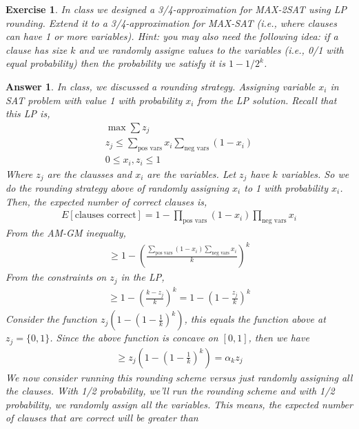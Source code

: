 \documentclass[12pt]{article}
\theoremstyle{colon}
\newtheorem{exercise}{Exercise}
\newtheorem*{answer}{Answer}
\begin{document}
\clearpage

\begin{exercise}
  In class we designed a 3/4-approximation for MAX-2SAT using LP rounding. Extend it to a 3/4-approximation for MAX-SAT (i.e., where clauses can have 1 or more variables). Hint: you may also need the following idea: if a clause has size $k$ and we randomly assigne values to the variables (i.e., 0/1 with equal probability) then the probability we satisfy it is $1-1/2^k$.
\end{exercise}

\begin{answer}
  In class, we discussed a rounding strategy. Assigning variable $x_i$ in SAT problem with value 1 with probability $x_i$ from the LP solution. Recall that this LP is,
  \begin{gather*}
    \max \sum z_j \\
    z_j \leq \sum_{\text{pos vars}} x_i \sum_{\text{neg vars}} (1-x_i) \\
    0 \leq x_i, z_i \leq 1
  \end{gather*}
  Where $z_j$ are the clausses and $x_i$ are the variables. Let $z_j$ have $k$ variables. So we do the rounding strategy above of randomly assigning $x_i$ to 1 with probability $x_i$. Then, the expected number of correct clauses is,
  \begin{gather*}
    E[\text{clauses correct}] = 1 - \prod_{\text{pos vars}} (1-x_i) \prod_{\text{neg vars}} x_i
  \end{gather*}
  From the AM-GM inequalty,
  \begin{gather*}
    \geq 1 - \left( \frac{\sum_{\text{pos vars}} (1-x_i) \sum_{\text{neg vars}} x_i}{k} \right)^k
  \end{gather*}
  From the constraints on $z_j$ in the LP,
  \begin{gather*}
    \geq 1 - \left( \frac{k - z_j}{k} \right)^k = 1 - \left( 1 - \frac{z_j}{k} \right)^k
  \end{gather*}
  Consider the function $z_j \left(1 - \left( 1 - \frac{1}{k} \right)^k \right)$, this equals the function above at $z_j = \{0,1\}$. Since the above function is concave on $[0,1]$, then we have
  \begin{gather*}
    \geq z_j \left(1 - \left( 1 - \frac{1}{k} \right)^k \right) = \alpha_k z_j
  \end{gather*}
  We now consider running this rounding scheme versus just randomly assigning all the clauses. With 1/2 probability, we'll run the rounding scheme and with 1/2 probability,  we randomly assign all the variables. This means, the expected number of clauses that are correct will be greater than

\end{answer}
\end{document}
